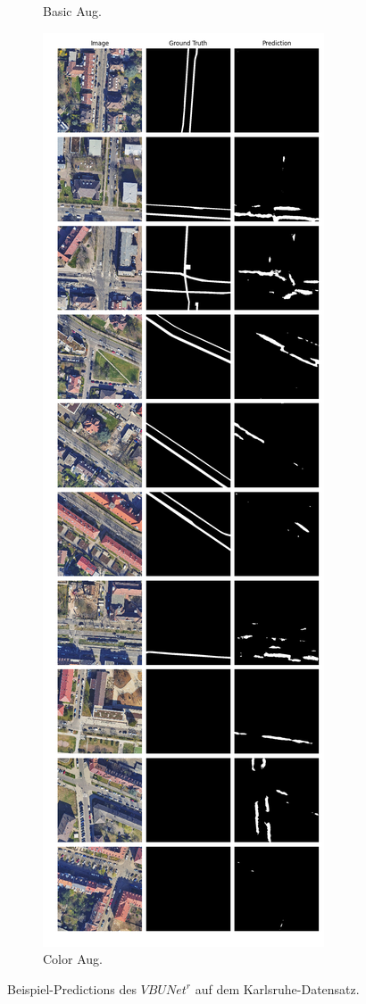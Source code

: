 \begin{figure}
\begin{subfigure}{.4\textwidth}
		\caption{Basic Aug.}
	\end{subfigure}
	\begin{subfigure}{.4\textwidth}
		\centering
		\includegraphics[width=1.\textwidth]{Bilder/karlsruhe-color-samples/vbunet-r.png}
		\caption{Color Aug.}
	\end{subfigure}
	\caption{Beispiel-Predictions des $VBUNet^r$ auf dem Karlsruhe-Datensatz.}
	\label{fig:ka-samples-vbunet-r}
	\end{figure}
	
